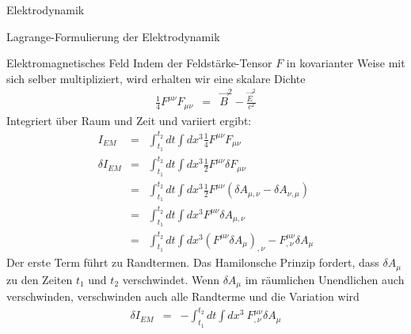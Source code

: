 \begin{chapter}{\titlestr}
\begin{section}{Elektrodynamik}
\begin{subsection}{Lagrange-Formulierung der Elektrodynamik}
\begin{subsubsection}{Elektromagnetisches Feld}
Indem der Feldstärke-Tensor $F$ in kovarianter Weise mit sich selber multipliziert, wird erhalten wir eine skalare Dichte
\begin{eqnarray*}
\frac{1}{4}F^{\mu\nu}F_{\mu\nu} &=& \vec{B}^2-\frac{\vec{E}^2}{c^2}
\end{eqnarray*}
Integriert über Raum und Zeit und variiert ergibt:
\begin{eqnarray*}
I_{EM} &=& \int_{t_1}^{t_2} dt \int dx^3 \frac{1}{4}F^{\mu\nu}F_{\mu\nu}\\
\delta I_{EM} &=& \int_{t_1}^{t_2} dt \int dx^3  \frac{1}{2}F^{\mu\nu}\delta F_{\mu\nu}\\
&=& \int_{t_1}^{t_2} dt \int dx^3  \frac{1}{2}F^{\mu\nu}\left(\delta A_{\mu,\nu}-\delta A_{\nu,\mu}\right)\\
&=& \int_{t_1}^{t_2} dt \int dx^3  F^{\mu\nu}\delta A_{\mu,\nu}\\
&=& \int_{t_1}^{t_2} dt \int dx^3  \left(F^{\mu\nu}\delta A_\mu\right)_{,\nu}-F^{\mu\nu}_{,\nu}\delta A_\mu
\end{eqnarray*}
Der erste Term führt zu Randtermen. Das Hamilonsche Prinzip fordert, dass $\delta A_\mu$ zu den Zeiten $t_1$ und $t_2$ verschwindet. Wenn $\delta A_\mu$ im räumlichen Unendlichen auch verschwinden, verschwinden auch alle Randterme und die Variation wird
\begin{eqnarray*}
\delta I_{EM} &=& -\int_{t_1}^{t_2} dt \int dx^3 \ F^{\mu\nu}_{,\nu}\delta A_\mu
\end{eqnarray*}
\end{subsubsection}


\end{subsection}
\end{section}
\end{chapter}
